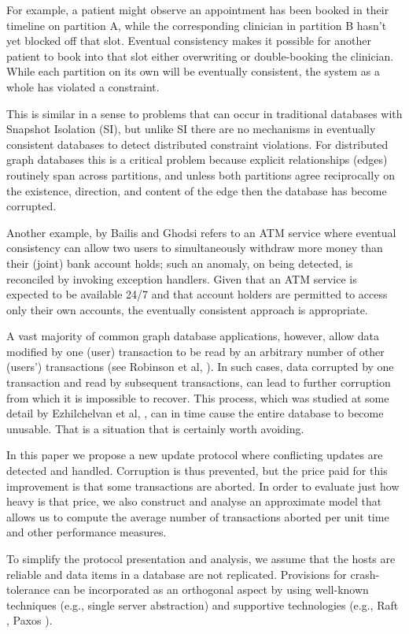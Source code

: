 \documentclass[runningheads]{llncs}
\begin{document}
For example, a patient might observe an appointment has been booked in
their timeline on partition A, while the corresponding clinician in
partition B hasn't yet blocked off that slot. Eventual consistency makes
it possible for another patient to book into that slot either overwriting
or double-booking the clinician. While each partition on its own will be
eventually consistent, the system as a whole has violated a constraint.

This is similar in a sense to problems that can occur in traditional
databases with Snapshot Isolation (SI), but unlike SI there are no
mechanisms in eventually consistent databases to detect distributed
constraint violations. For distributed graph databases this is a critical
problem because explicit relationships (edges) routinely span across
partitions, and unless both partitions agree reciprocally on the existence,
direction, and content of the edge then the database has become corrupted.

Another example, by Bailis and Ghodsi \cite{bai} refers to an ATM service
where eventual consistency can allow two users to simultaneously
withdraw more money than their (joint) bank account holds; such
an anomaly, on being detected, is reconciled by invoking exception
handlers. Given that an ATM service is expected to be available
24/7 and that account holders are permitted to access only their own
accounts, the eventually consistent approach is appropriate.

A vast majority of common graph database applications, however, allow
data modified by one (user) transaction to be read by an arbitrary
number of other (users') transactions (see Robinson et al, \cite{rob}).
In such cases, data corrupted
by one transaction and read by subsequent transactions, can lead to
further corruption from which it is impossible to recover.
This process, which was studied at some detail by Ezhilchelvan
et al, \cite{emw}, can in time cause the entire database to become
unusable. That is a situation that is certainly worth avoiding.

In this paper we propose a new update protocol where conflicting updates
are detected and handled. Corruption is thus prevented, but the price
paid for this improvement is that some transactions are aborted. In order
to evaluate just how heavy is that price, we also construct and analyse an
approximate model that allows us to compute the average number of transactions
aborted per unit time and other performance measures.

To simplify the protocol presentation and analysis, we assume that the
hosts are reliable and data items in a database are not replicated.
Provisions for crash-tolerance can be incorporated as an orthogonal
aspect by using well-known techniques (e.g., single server abstraction)
and supportive technologies (e.g., Raft \cite{raft}, Paxos \cite{paxos}).
\end{document}
